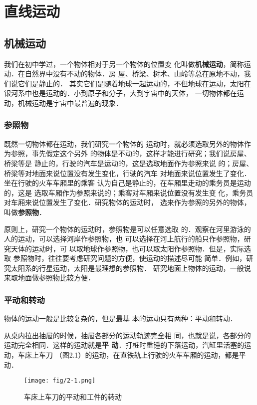 \chapter{直线运动}

\section{机械运动}
 我们在初中学过，一个物体相对于另一个物体的位置变
化叫做\textbf{机械运动}，简称运动．在自然界中没有不动的物体．房
屋、桥梁、树术、山岭等总在原地不动，我们说它们是静止的．
其实它们是随着地球一起运动的，不但地球在运动，太阳在
银河系中也是运动的．小到原子和分子，大到宇宙中的天体，
一切物体都在运动，机械运动是宇宙中最普遍的现象．

    \subsection{参照物} 

既然一切物体都在运动，我们研究一个物体的
运动时，就必须选取另外的物体作为参照，事先假定这个另外
的物体是不动的，这样才能进行研究；我们说房屋、桥梁等是
静止的，行驶的汽车是运动的，这是选取地面作为参照来说
的；房屋、桥梁等对地面来说位置没有发生变化，行驶的汽车
对地面来说位置发生了变化．坐在行驶的火车车厢里的乘客
认为自己是静止的，在车厢里走动的乘务员是运动的，这是
选取车厢作为参照来说的；乘客对车厢来说位置没有发生变
化，乘务员对车厢来说位置发生了变化．研究物体的运动时，
选来作为参照的另外的物体，叫做\textbf{参照物}．

    原则上，研究一个物体的运动时，参照物是可以任意选取
的．观察在河里游泳的人的运动，可以选择河岸作参照物，也
可以选择在河上航行的船只作参照物，研究天体的运动时，可
以取地球作参照物，也可以取太阳作参照物．但是，实际选取
参照物时，往往要考虑研究问题的方便，使运动的描述尽可能
简单．例如，研究太阳系的行星运动，太阳是最理想的参照物．
研究地面上物体的运动，一般说来取地面做参照物比较方便．

\subsection{平动和转动} 
 物体的运动一般是比较复杂的，但是最基
本的运动只有两种：平动和转动．

    从桌内拉出抽屉的时候，抽屉各部分的运动轨迹完全相
同，也就是说，各部分的运动完全相同．这样的运动就是\textbf{平
动}．打桩时重锤的下落运动，汽缸里活塞的运动，车床上车刀
（图2.1）的运动，在直铁轨上行驶的火车车厢的运动，都是平
动．
\begin{figure}[htp]
\centering
\texttt{[image: fig/2-1.png]}
\caption{车床上车刀的平动和工件的转动}
\end{figure}

